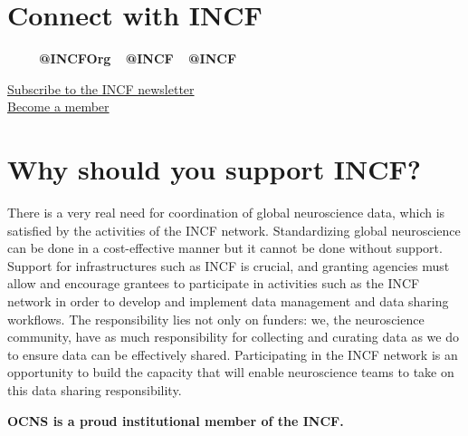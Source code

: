 \section*{Connect with INCF}
\sectionauthor{\vspace{-4ex}}
\vspace{1ex}
\begin{center}
  \href{https://twitter.com/INCFOrg}{}~
  \href{https://www.facebook.com/INCForg/}{}~
  \href{https://bsky.app/profile/incforg.bsky.social}{}~
  \textbf{\Large @INCFOrg}
  \hspace{1cm}\href{https://neuromatch.social/@INCF}{}~
  \textbf{\Large @INCF}
  \hspace{1.2cm}\href{https://www.linkedin.com/company/international-neuroinformatics-coordinating-facility-incf-}{}~
  \textbf{\Large @INCF}
\end{center}
\vspace{1ex}

\begin{center}
\begin{tcolorbox}[colback=lighterOrange, colframe=black, width=0.7\textwidth, boxrule=0.1mm]
\begin{center}
  \href{https://mailchi.mp/incf/signup}{Subscribe to the INCF newsletter}\\\vspace{1ex}\href{https://www.incf.org/join-incf}{Become a member}
\end{center}
\end{tcolorbox}
\end{center}

\section*{Why should you support INCF?}
\sectionauthor{\vspace{-4ex}}
There is a very real need for coordination of global neuroscience data, which is satisfied by the activities of the INCF network.
Standardizing global neuroscience can be done in a cost-effective manner but it cannot be done without support.
Support for infrastructures such as INCF is crucial, and granting agencies must allow and encourage grantees to participate in activities such as the INCF network in order to develop and implement data management and data sharing workflows.
The responsibility lies not only on funders: we, the neuroscience community, have as much responsibility for collecting and curating data as we do to ensure data can be effectively shared.
Participating in the INCF network is an opportunity to build the capacity that will enable neuroscience teams to take on this data sharing responsibility.


\textbf{OCNS is a proud institutional member of the INCF.}
